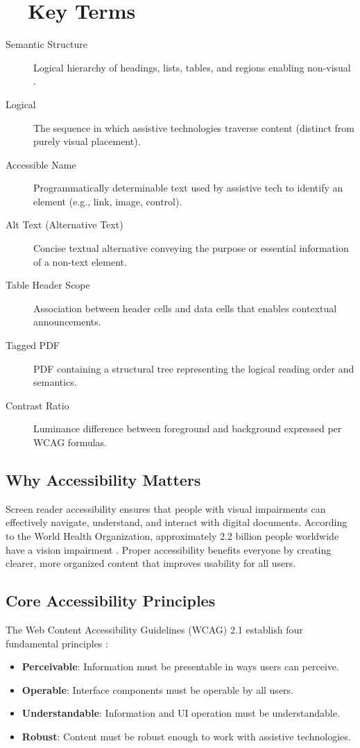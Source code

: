 \section{~~Key Terms}\label{ch15:sec:key-terms}
\begin{description}
	\item[Semantic Structure] Logical hierarchy of headings, lists, tables, and regions enabling non-visual .
	\item[Logical ] The sequence in which assistive technologies traverse content (distinct from purely visual placement).
	\item[Accessible Name] Programmatically determinable text used by assistive tech to identify an element (e.g., link, image, control).
	\item[Alt Text (Alternative Text)] Concise textual alternative conveying the purpose or essential information of a non-text element.
	\item[Table Header Scope] Association between header cells and data cells that enables contextual announcements.
	\item[Tagged PDF] PDF containing a structural tree representing the logical reading order and semantics.
	\item[Contrast Ratio] Luminance difference between foreground and background expressed per WCAG formulas.
\end{description}

\subsection{Why Accessibility Matters}\label{ch15:ssec:why-matters}
Screen reader accessibility ensures that people with visual impairments can effectively navigate, understand, and interact with digital documents. According to the World Health Organization, approximately 2.2 billion people worldwide have a vision impairment \supercite{WHO2021}. Proper accessibility benefits everyone by creating clearer, more organized content that improves usability for all users.

\subsection{Core Accessibility Principles}\label{ch15:ssec:core-principles}
The Web Content Accessibility Guidelines (WCAG) 2.1 establish four fundamental principles \supercite{WCAG2018}:
\begin{itemize}
	\item \textbf{Perceivable}: Information must be presentable in ways users can perceive.
	\item \textbf{Operable}: Interface components must be operable by all users.
	\item \textbf{Understandable}: Information and UI operation must be understandable.
	\item \textbf{Robust}: Content must be robust enough to work with assistive technologies.
\end{itemize}


